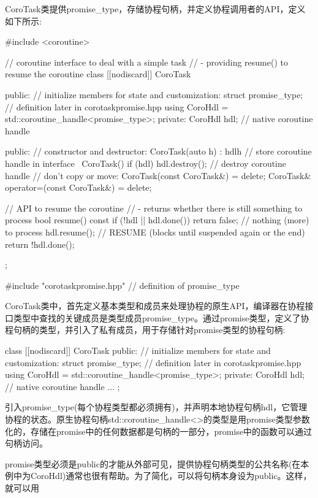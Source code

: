 
CoroTask类提供promise\_type，存储协程句柄，并定义协程调用者的API，定义如下所示:


\begin{cpp}
#include <coroutine>

// coroutine interface to deal with a simple task
// - providing resume() to resume the coroutine
class [[nodiscard]] CoroTask {
public:
	// initialize members for state and customization:
	struct promise_type; // definition later in corotaskpromise.hpp
	using CoroHdl = std::coroutine_handle<promise_type>;
private:
	CoroHdl hdl; // native coroutine handle

public:
	// constructor and destructor:
	CoroTask(auto h)
	: hdl{h} { // store coroutine handle in interface
	}
	~CoroTask() {
		if (hdl) {
			hdl.destroy(); // destroy coroutine handle
		}
	}
	// don’t copy or move:
	CoroTask(const CoroTask&) = delete;
	CoroTask& operator=(const CoroTask&) = delete;

	// API to resume the coroutine
	// - returns whether there is still something to process
	bool resume() const {
		if (!hdl || hdl.done()) {
			return false; // nothing (more) to process
		}
		hdl.resume(); // RESUME (blocks until suspended again or the end)
		return !hdl.done();
	}
};

#include "corotaskpromise.hpp" // definition of promise_type
\end{cpp}

CoroTask类中，首先定义基本类型和成员来处理协程的原生API，编译器在协程接口类型中查找的关键成员是类型成员promise\_type。通过promise类型，定义了协程句柄的类型，并引入了私有成员，用于存储针对promise类型的协程句柄:

\begin{cpp}
class [[nodiscard]] CoroTask {
public:
	// initialize members for state and customization:
	struct promise_type; // definition later in corotaskpromise.hpp
	using CoroHdl = std::coroutine_handle<promise_type>;
private:
	CoroHdl hdl; // native coroutine handle
	...
};
\end{cpp}

引入promise\_type(每个协程类型都必须拥有)，并声明本地协程句柄hdl，它管理协程的状态。原生协程句柄std::coroutine\_handle<>的类型是用promise类型参数化的，存储在promise中的任何数据都是句柄的一部分，promise中的函数可以通过句柄访问。

promise类型必须是public的才能从外部可见，提供协程句柄类型的公共名称(在本例中为CoroHdl)通常也很有帮助。为了简化，可以将句柄本身设为public。这样，就可以用

